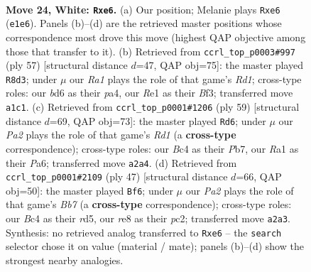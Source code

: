 \documentclass[11pt]{article}
\begin{document}
\clearpage

\begin{figure}[p]\centering
\begin{subfigure}{0.46\textwidth}\centering
\resizebox{\linewidth}{!}{%
\newchessgame
\chessboard[
  setfen={4r1k1/pp5p/3bp1p1/8/2B5/5qP1/PP3P1P/R3R1K1 w - - 0 24},
  showmover=false,
  pgfstyle=straightmove, color=movearrow, markmove={e1-e6}
]}
\caption{}
\end{subfigure}\hfill
\begin{subfigure}{0.46\textwidth}\centering
\resizebox{\linewidth}{!}{%
\newchessgame
\chessboard[
  setfen={3r2k1/5pp1/1p2p2p/4Q3/P6P/1P3bP1/3r1P1K/5R2 b - - 0 29},
  showmover=false,
  pgfstyle=straightmove, color=movearrow, markmove={d8-d3}
]}
\caption{}
\end{subfigure}
\\[4pt]
\begin{subfigure}{0.46\textwidth}\centering
\resizebox{\linewidth}{!}{%
\newchessgame
\chessboard[
  setfen={3rr1k1/1p3p2/p1p5/P4bp1/4p2P/2P1Q2n/1PB2P2/R6K b - - 3 30},
  showmover=false,
  pgfstyle=straightmove, color=movearrow, markmove={d8-d6}
]}
\caption{}
\end{subfigure}\hfill
\begin{subfigure}{0.46\textwidth}\centering
\resizebox{\linewidth}{!}{%
\newchessgame
\chessboard[
  setfen={r3r1k1/4pp1p/p5p1/1p1R2Q1/7P/8/PbP2PP1/6K1 b - - 0 24},
  showmover=false,
  pgfstyle=straightmove, color=movearrow, markmove={b2-f6}
]}
\caption{}
\end{subfigure}
\caption{\textbf{Move 24, White: \texttt{Rxe6}.} (a) Our position; Melanie plays \texttt{Rxe6} (\texttt{e1e6}). Panels (b)--(d) are the retrieved master positions whose correspondence most drove this move (highest QAP objective among those that transfer to it). (b) Retrieved from \texttt{ccrl\_top\_p0003\#997} (ply 57) [structural distance $d$=47, QAP obj=75]: the master played \texttt{R8d3}; under $\mu$ our \emph{Ra1} plays the role of that game's \emph{Rd1}; cross-type roles: our \emph{b}d6 as their \emph{p}a4, our \emph{R}e1 as their \emph{B}f3; transferred move \texttt{a1c1}. (c) Retrieved from \texttt{ccrl\_top\_p0001\#1206} (ply 59) [structural distance $d$=69, QAP obj=73]: the master played \texttt{Rd6}; under $\mu$ our \emph{Pa2} plays the role of that game's \emph{Rd1} (a \textbf{cross-type} correspondence); cross-type roles: our \emph{B}c4 as their \emph{P}b7, our \emph{R}a1 as their \emph{P}a6; transferred move \texttt{a2a4}. (d) Retrieved from \texttt{ccrl\_top\_p0001\#2109} (ply 47) [structural distance $d$=66, QAP obj=50]: the master played \texttt{Bf6}; under $\mu$ our \emph{Pa2} plays the role of that game's \emph{Bb7} (a \textbf{cross-type} correspondence); cross-type roles: our \emph{B}c4 as their \emph{r}d5, our \emph{r}e8 as their \emph{p}c2; transferred move \texttt{a2a3}. Synthesis: no retrieved analog transferred to \texttt{Rxe6} -- the \texttt{search} selector chose it on value (material / mate); panels (b)--(d) show the strongest nearby analogies.}
\label{fig:thought-m46}
\end{figure}
\end{document}
